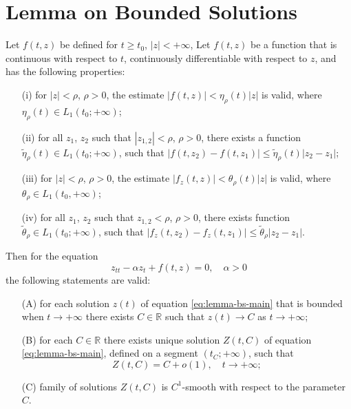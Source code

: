 \appendix
\renewcommand\thechapter{\Alph{chapter}}

\chapter{Lemma on Bounded Solutions}
\label{appendix:lemma-on-bounded-solutions}

\begin{lemma*}
	Let $f(t, z)$ be defined for $t \ge t_0$, $|z| < +\infty$,
	Let $f(t, z)$ be a function that is continuous with respect to $t$, continuously differentiable with respect to $z$, and has the following properties:
	\begin{itemize}
		\item[(i)] for $|z| < \rho$, $\rho > 0$, the estimate $|f(t, z)| < \eta_{\rho}(t)|z|$ is valid, where $\eta_{\rho}(t) \in L_1(t_0; +\infty)$;
		\item[(ii)] for all $z_1$, $z_2$ such that $|z_{1,2}| < \rho$, $\rho > 0$, there exists a function $\tilde{\eta}_{\rho}(t) \in L_1(t_0; +\infty)$, such that $|f(t, z_2) - f(t, z_1)| \le \tilde{\eta}_{\rho}(t) |z_2 - z_1|$;
		\item[(iii)] for $|z| < \rho$, $\rho > 0$, the estimate $|f_z(t, z)| < \theta_{\rho}(t) |z|$ is valid, where $\theta_{\rho} \in L_1(t_0, +\infty)$;
		\item[(iv)] for all $z_1$, $z_2$ such that $z_{1,2} < \rho$, $\rho > 0$, there exists function $\tilde{\theta}_{\rho} \in L_1(t_0; +\infty)$, such that $|f_z(t, z_2) - f_z(t, z_1)| \le \tilde{\theta}_{\rho} |z_2 - z_1|$.
	\end{itemize}
	Then for the equation
	\begin{equation}
		z_{tt} - \alpha z_t + f(t, z) = 0, \quad \alpha > 0
		\label{eq:lemma-bs-main}
	\end{equation}
	the following statements are valid:
	\begin{itemize}
		\item[(A)] for each solution $z(t)$ of equation \eqref{eq:lemma-bs-main} that is bounded when $t \to +\infty$ there exists $C \in \mathbb{R}$ such that $z(t) \to C$ as $t \to +\infty$;
		\item[(B)] for each $C \in \mathbb{R}$ there exists unique solution $Z(t, C)$ of equation \eqref{eq:lemma-bs-main}, defined on a segment $(t_C; +\infty)$, such that
		\begin{equation}
			Z(t, C) = C + o(1), \quad t \to +\infty;
		\end{equation}
		\item[(C)] family of solutions $Z(t, C)$ is $C^1$-smooth with respect to the parameter $C$.
	\end{itemize}
\end{lemma*}

